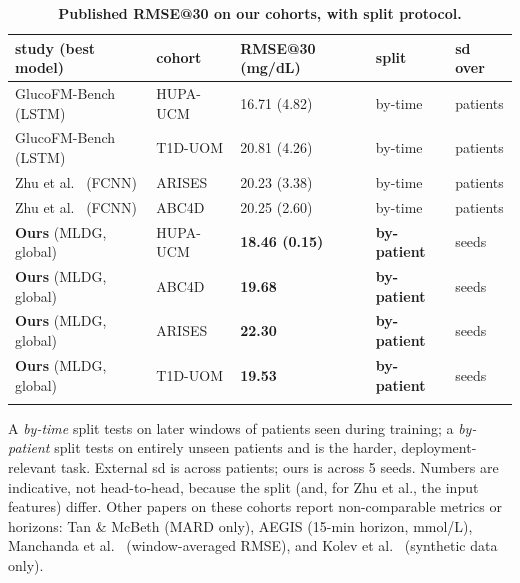 \documentclass[10pt,letterpaper]{article}
\newlength\savedwidth
\newcommand\thickhline{\noalign{\global\savedwidth\arrayrulewidth\global\arrayrulewidth 2pt}%
\hline
\noalign{\global\arrayrulewidth\savedwidth}}
\begin{document}
\begin{table}[!ht]
\centering
\captionsetup{justification=centering,singlelinecheck=on}
\caption{\bf Published RMSE@30 on our cohorts, with split protocol.}
\label{tab:prior}
\begin{tabular}{lllll}
\thickhline
study (best model) & cohort & RMSE@30 (mg/dL) & split & sd over \\
\hline
GlucoFM-Bench \cite{lu2026glucofmbench} (LSTM) & HUPA-UCM & 16.71 (4.82) & by-time & patients \\
GlucoFM-Bench \cite{lu2026glucofmbench} (LSTM) & T1D-UOM  & 20.81 (4.26) & by-time & patients \\
Zhu et al.\ \cite{zhu2023fcnn} (FCNN)          & ARISES   & 20.23 (3.38) & by-time & patients \\
Zhu et al.\ \cite{zhu2023fcnn} (FCNN)          & ABC4D    & 20.25 (2.60) & by-time & patients \\
\hline
\textbf{Ours} (MLDG, global)            & HUPA-UCM & \textbf{18.46 (0.15)} & \textbf{by-patient} & seeds \\
\textbf{Ours} (MLDG, global)            & ABC4D    & \textbf{19.68} & \textbf{by-patient} & seeds \\
\textbf{Ours} (MLDG, global)            & ARISES   & \textbf{22.30} & \textbf{by-patient} & seeds \\
\textbf{Ours} (MLDG, global)            & T1D-UOM  & \textbf{19.53} & \textbf{by-patient} & seeds \\
\thickhline
\end{tabular}
\begin{center}
{\small A \emph{by-time} split tests on later windows of patients seen during
training; a \emph{by-patient} split tests on entirely unseen patients and is the
harder, deployment-relevant task. External sd is across patients; ours is across
5 seeds. Numbers are indicative, not head-to-head, because the split (and, for
Zhu et al., the input features) differ. Other papers on these cohorts report
non-comparable metrics or horizons: Tan \& McBeth \cite{tan2026uncertainty}
(MARD only), AEGIS \cite{pansheriya2026aegis} (15-min horizon, mmol/L),
Manchanda et al.\ \cite{manchanda2025lstm} (window-averaged RMSE), and Kolev
et al.\ \cite{kolev2026benchmark} (synthetic data only).}
\end{center}
\end{table}
\end{document}
